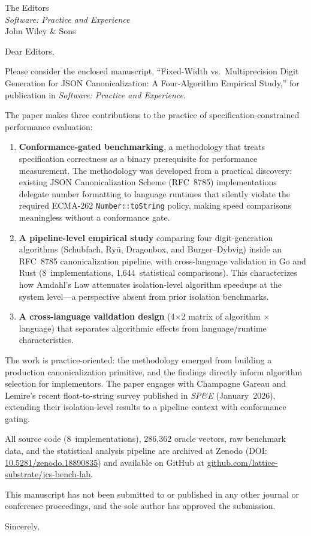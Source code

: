 \documentclass[12pt]{letter}
\begin{document}
\begin{letter}{%
The Editors\\
\textit{Software: Practice and Experience}\\
John Wiley \& Sons}

\opening{Dear Editors,}

Please consider the enclosed manuscript, ``Fixed-Width vs.\
Multiprecision Digit Generation for JSON Canonicalization: A
Four-Algorithm Empirical Study,'' for publication in \textit{Software:
Practice and Experience}.

The paper makes three contributions to the practice of
specification-constrained performance evaluation:

\begin{enumerate}
\item \textbf{Conformance-gated benchmarking}, a methodology that
      treats specification correctness as a binary prerequisite for
      performance measurement.  The methodology was developed from a
      practical discovery: existing JSON Canonicalization Scheme
      (RFC~8785) implementations delegate number formatting to language
      runtimes that silently violate the required ECMA-262
      \texttt{Number::toString} policy, making speed comparisons
      meaningless without a conformance gate.

\item \textbf{A pipeline-level empirical study} comparing four
      digit-generation algorithms (Schubfach, Ry\=u, Dragonbox, and
      Burger--Dybvig) inside an RFC~8785 canonicalization pipeline,
      with cross-language validation in Go and Rust (8~implementations,
      1,644~statistical comparisons).  This characterizes how Amdahl's
      Law attenuates isolation-level algorithm speedups at the system
      level---a perspective absent from prior isolation benchmarks.

\item \textbf{A cross-language validation design} (4$\times$2 matrix
      of algorithm $\times$ language) that separates algorithmic effects
      from language/runtime characteristics.
\end{enumerate}

The work is practice-oriented: the methodology emerged from building a
production canonicalization primitive, and the findings directly inform
algorithm selection for implementors.  The paper engages with Champagne
Gareau and Lemire's recent float-to-string survey published in
\textit{SP\&E} (January~2026), extending their isolation-level results
to a pipeline context with conformance gating.

All source code (8~implementations), 286,362 oracle vectors, raw
benchmark data, and the statistical analysis pipeline are archived at
Zenodo (DOI: \href{https://doi.org/10.5281/zenodo.18890835}{10.5281/zenodo.18890835})
and available on GitHub at
\href{https://github.com/lattice-substrate/jcs-bench-lab}{github.com/lattice-substrate/jcs-bench-lab}.

This manuscript has not been submitted to or published in any other
journal or conference proceedings, and the sole author has approved
the submission.

\closing{Sincerely,}

\end{letter}
\end{document}
